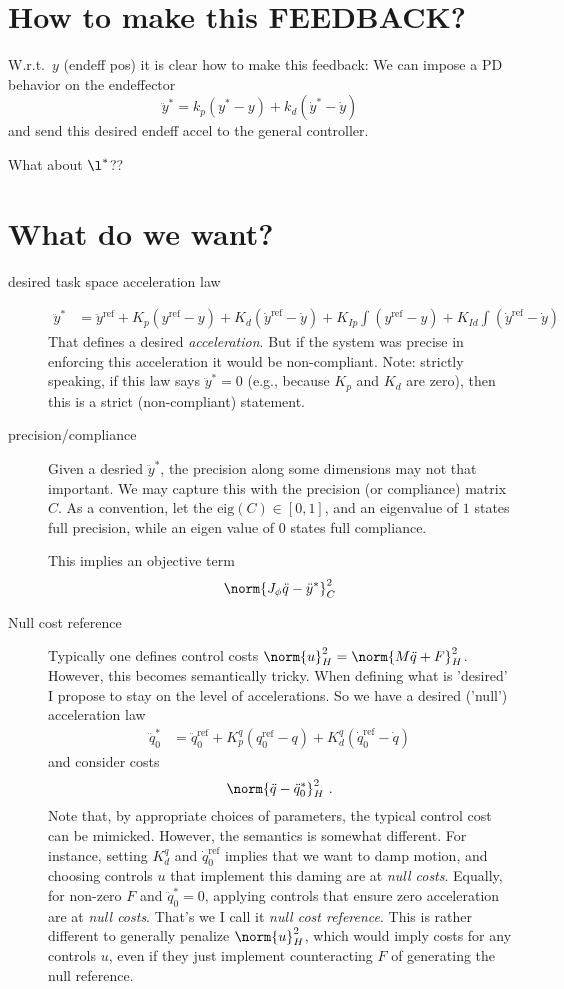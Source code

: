 \documentclass[10pt,fleqn,twoside]{article}
\newcommand{\rf}{{\text{ref}}}
\newcommand{\eig}{{\text{eig}}}
\begin{document}
\section{How to make this FEEDBACK?}

W.r.t.\ $y$ (endeff pos) it is clear how to make this feedback: We can
impose a PD behavior on the endeffector
$$ \ddot y^* = k_p (y^* - y) + k_d (\dot y^*-\dot y) $$
and send this desired endeff accel to the general controller.

What about $\l^*$??

\section{What do we want?}

\begin{description}
\item[desired task space acceleration law]
\begin{align}
\ddot y^*
 &= \ddot y^\rf + K_p(y^\rf-y) + K_d (\dot y^\rf -\dot y) + K_{Ip} \int (y^\rf-y) + K_{Id} \int (\dot y^\rf -\dot y)
\end{align}
That defines a desired \emph{acceleration}. But if the system was
precise in enforcing this acceleration it would be
non-compliant. Note: strictly speaking, if this law says $\ddot y^*=0$
(e.g., because $K_p$ and $K_d$ are zero), then this is a strict
(non-compliant) statement.

\item[precision/compliance]
Given a desried $\ddot y^*$, the precision along some
dimensions may not that important. We may capture this with the
precision (or compliance) matrix $C$. As a convention, let the
$\eig(C)\in[0,1]$, and an eigenvalue of $1$ states full precision,
while an eigen value of $0$ states full compliance.

This implies an objective term
$$\norm{J_\phi \ddot q - \ddot y^*}^2_C$$

\item[Null cost reference] Typically one defines control costs
  $\norm{u}^2_H = \norm{M \ddot q + F}^2_H$. However, this becomes
  semantically tricky. When defining what is 'desired' I propose to
  stay on the level of accelerations. So we have a desired ('null')
  acceleration law
\begin{align}
\ddot q_0^*
 &= \ddot q_0^\rf + K^q_p (q_0^\rf-q) + K^q_d (\dot q_0^\rf -\dot q)
\end{align}
and consider costs
$$\norm{\ddot q - \ddot q_0^*}^2_H ~.$$ Note that, by appropriate
choices of parameters, the typical control cost can be
mimicked. However, the semantics is somewhat different. For instance,
setting $K^q_d$ and $\dot q_0^\rf$ implies that we want to damp
motion, and choosing controls $u$ that implement this daming are at
\emph{null costs}. Equally, for non-zero $F$ and $\ddot q_0^*=0$,
applying controls that ensure zero acceleration are at \emph{null
  costs}. That's we I call it \emph{null cost reference}. This is
rather different to generally penalize $\norm{u}^2_H$, which would
imply costs for any controls $u$, even if they just implement
counteracting $F$ of generating the null reference.


\end{description}
\end{document}
